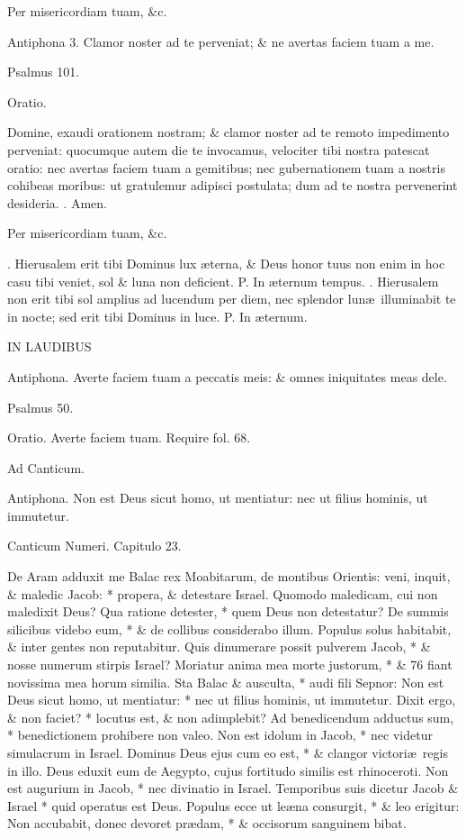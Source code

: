 \documentclass[letter,11pt]{book}
\makeatletter
\DeclareRobustCommand{\Vbar}{\vers@resp{-0.1em}{V}}
\DeclareRobustCommand{\Rbar}{\vers@resp{0pt}{R}}
\newcommand{\vers@resp@sym}{\raisebox{0.2ex}{\rotatebox[origin=c]{-20}{$\m@th\rceil$}}}
\newcommand{\vers@resp}[2]{%
  {\ooalign{\hidewidth\kern#1\vers@resp@sym\hidewidth\cr#2\cr}}%
}%
\def\P{\color{Red} P. \color{black}}
\def\V{\color{Red} \Vbar . \color{black}}
\def\R{\color{Red} \Rbar . \color{black}}
\makeatother
\begin{document}
\begin{multicols*}{2}
Per misericordiam tuam, \&c.

Antiphona 3. Clamor noster ad te perveniat; \& ne avertas faciem tuam a me.

Psalmus 101.

Oratio.

Domine, exaudi orationem nostram; \& clamor noster ad te remoto impedimento perveniat: quocumque autem die te invocamus, velociter tibi nostra patescat oratio: nec avertas faciem tuam a gemitibus; nec gubernationem tuam a nostris cohibeas moribus: ut gratulemur adipisci postulata; dum ad te nostra pervenerint desideria.
\R Amen.

Per misericordiam tuam, \&c.

\R Hierusalem erit tibi Dominus lux \ae terna, \& Deus honor tuus non enim in hoc casu tibi veniet, sol \& luna non deficient. \P In \ae ternum tempus. \V Hierusalem non erit tibi sol amplius ad lucendum per diem, nec splendor lun\ae \ illuminabit te in nocte; sed erit tibi Dominus in luce. \P In \ae ternum.

IN LAUDIBUS

Antiphona. Averte faciem tuam a peccatis meis: \& omnes iniquitates meas dele.

Psalmus 50.

Oratio. Averte faciem tuam. Require fol. 68.

Ad Canticum.

Antiphona. Non est Deus sicut homo, ut mentiatur: nec ut filius hominis, ut immutetur.

Canticum Numeri. Capitulo 23.

De Aram adduxit me Balac rex Moabitarum, de montibus Orientis: veni, inquit, \& maledic Jacob: * propera, \& detestare Israel. Quomodo maledicam, cui non maledixit Deus?
Qua ratione detester, * quem Deus non detestatur?
De summis silicibus videbo eum, * \& de collibus considerabo illum.
Populus solus habitabit, \& inter gentes non reputabitur.
Quis dinumerare possit pulverem Jacob, * \& nosse numerum stirpis Israel?
Moriatur anima mea morte justorum, * \& 76 fiant novissima mea horum similia.
Sta Balac \& ausculta, * audi fili Sepnor:
Non est Deus sicut homo, ut mentiatur: * nec ut filius hominis, ut immutetur.
Dixit ergo, \& non faciet? * locutus est, \& non adimplebit?
Ad benedicendum adductus sum, * benedictionem prohibere non valeo.
Non est idolum in Jacob, * nec videtur simulacrum in Israel.
Dominus Deus ejus cum eo est, * \& clangor victori\ae \ regis in illo.
Deus eduxit eum de Aegypto, cujus fortitudo similis est rhinoceroti.
Non est augurium in Jacob, * nec divinatio in Israel.
Temporibus suis dicetur Jacob \& Israel * quid operatus est Deus.
Populus ecce ut le\ae na consurgit, * \& leo erigitur:
Non accubabit, donec devoret pr\ae dam, * \& occisorum sanguinem bibat.


\end{multicols*}
\end{document}

